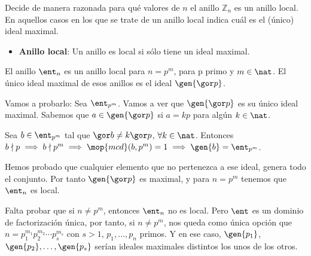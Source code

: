 \begin{problem}
Decide de manera razonada para qué valores de $n$ el anillo ${\mathbb Z}_n$ es un anillo local. En aquellos casos en los que se trate de un anillo local indica cuál es el (único) ideal maximal.

\solution


\begin{defToUse}
	\begin{itemize}
		\item \textbf{Anillo local}: Un anillo es local si sólo tiene un ideal maximal.
	\end{itemize}
\end{defToUse}

El anillo $\ent_n$ es un anillo local para $n=p^m$, para p primo y $m \in \nat$. El único ideal maximal de esos anillos es el ideal $\gen{\cls{p}}$.

Vamos a probarlo:
Sea $\ent_{p^m}$. Vamos a ver que $\gen{\cls{p}}$ es su único ideal maximal. Sabemos que $a\in \gen{\cls{p}}$ si $a=kp$ para algún $k\in \nat$.

Sea $b \in \ent_{p^m}$ tal que $\cls{b} \neq k\cls{p}$, $\forall k \in \nat$. Entonces $b \nmid p \implies b \nmid p^m \implies \mop{mcd} (b,p^m) =1 \implies \gen{b} = \ent_{p^m}$.

Hemos probado que cualquier elemento que no pertenezca a ese ideal, genera todo el conjunto. Por tanto $\gen{\cls{p}}$ es maximal, y para $n=p^m$ tenemos que $\ent_n$ es local.

Falta probar que si $n \neq p^m$, entonces $\ent_n$ no es local. Pero $\ent$ es un dominio de factorización única, por tanto, si $n \neq p^m$, nos queda como única opción que $n=p_1^{m_1}p_2^{m_2}\dotsb p_s^{m_s}$ con $s > 1$, $p_1,\dotsc,p_n$ primos. Y en ese caso, $\gen{p_1}$, $\gen{p_2},\dotsc,\gen{p_s}$ serían ideales maximales distintos los unos de los otros.

\end{problem}


